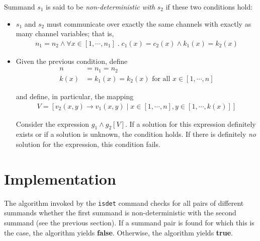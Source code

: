 Summand $s_1$ is said to be \emph{non-deterministic with} $s_2$ if these two conditions hold:

\begin{itemize}
\item $s_1$ and $s_2$ must communicate over exactly the same channels with exactly as many channel variables; that is,
\begin{align*}
n_1 = n_2 \land \forall x \in [1, \cdots{}, n_1] \;.\; c_1(x) = c_2(x) \land k_1(x) = k_2(x)
\end{align*}

\item Given the previous condition, define
\begin{align*}
n &= n_1 = n_2 \\
k(x) &= k_1(x) = k_2(x) \text{ for all } x \in [1, \cdots{}, n]
\end{align*}

and define, in particular, the mapping
\begin{align*}
V = [v_2(x,y) \rightarrow v_1(x,y) \;|\; x \in [1, \cdots{}, n], y \in [1, \cdots{}, k(x)]]
\end{align*}

Consider the expression $g_1 \land g_2[V]$.
If a solution for this expression definitely exists or if a solution is unknown, the condition holds.
If there is definitely \emph{no} solution for the expression, this condition fails.
\end{itemize}

\section{Implementation}

The algorithm invoked by the \texttt{isdet} command checks for all pairs of different summands whether the first summand is non-deterministic with the second summand (see the previous section).
If a summand pair is found for which this is the case, the algorithm yields \textbf{false}.
Otherwise, the algorithm yields \textbf{true}.


%

